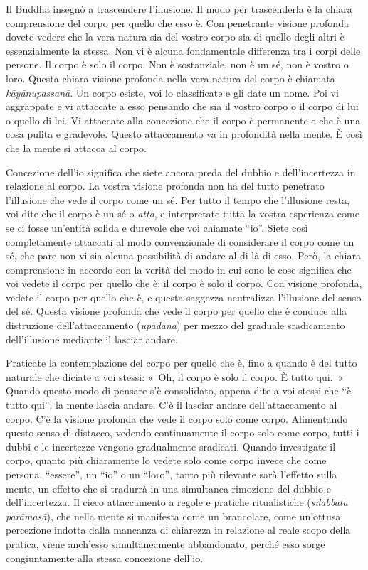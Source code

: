 Il Buddha insegnò a trascendere l'illusione. Il modo per trascenderla è
la chiara comprensione del corpo per quello che esso è. Con penetrante
visione profonda dovete vedere che la vera natura sia del vostro corpo
sia di quello degli altri è essenzialmente la stessa. Non vi è alcuna
fondamentale differenza tra i corpi delle persone. Il corpo è solo il
corpo. Non è sostanziale, non è un sé, non è vostro o loro. Questa
chiara visione profonda nella vera natura del corpo è chiamata
\emph{kāyānupassanā}. Un corpo esiste, voi lo classificate e gli date un
nome. Poi vi aggrappate e vi attaccate a esso pensando che sia il vostro
corpo o il corpo di lui o quello di lei. Vi attaccate alla concezione
che il corpo è permanente e che è una cosa pulita e gradevole. Questo
attaccamento va in profondità nella mente. È così che la mente si
attacca al corpo.

Concezione dell'io significa che siete ancora preda del dubbio e
dell'incertezza in relazione al corpo. La vostra visione profonda non ha
del tutto penetrato l'illusione che vede il corpo come un sé. Per tutto
il tempo che l'illusione resta, voi dite che il corpo è un sé o
\emph{atta}, e interpretate tutta la vostra esperienza come se ci fosse
un'entità solida e durevole che voi chiamate ``io''. Siete così
completamente attaccati al modo convenzionale di considerare il corpo
come un sé, che pare non vi sia alcuna possibilità di andare al di là di
esso. Però, la chiara comprensione in accordo con la verità del modo in
cui sono le cose significa che voi vedete il corpo per quello che è: il
corpo è solo il corpo. Con visione profonda, vedete il corpo per quello
che è, e questa saggezza neutralizza l'illusione del senso del sé.
Questa visione profonda che vede il corpo per quello che è conduce alla
distruzione dell'attaccamento (\emph{upādāna}) per mezzo del graduale
sradicamento dell'illusione mediante il lasciar andare.

Praticate la contemplazione del corpo per quello che è, fino a quando è
del tutto naturale che diciate a voi stessi: «~Oh, il corpo è solo il
corpo. È tutto qui.~» Quando questo modo di pensare s'è consolidato,
appena dite a voi stessi che ``è tutto qui'', la mente lascia andare.
C'è il lasciar andare dell'attaccamento al corpo. C'è la visione
profonda che vede il corpo solo come corpo. Alimentando questo senso di
distacco, vedendo continuamente il corpo solo come corpo, tutti i dubbi
e le incertezze vengono gradualmente sradicati. Quando investigate il
corpo, quanto più chiaramente lo vedete solo come corpo invece che come
persona, ``essere'', un ``io'' o un ``loro'', tanto più rilevante sarà
l'effetto sulla mente, un effetto che si tradurrà in una simultanea
rimozione del dubbio e dell'incertezza. Il cieco attaccamento a regole e
pratiche ritualistiche (\emph{sīlabbata parāmasā}), che nella mente si
manifesta come un brancolare, come un'ottusa percezione indotta dalla
mancanza di chiarezza in relazione al reale scopo della pratica, viene
anch'esso simultaneamente abbandonato, perché esso sorge congiuntamente
alla stessa concezione dell'io.

